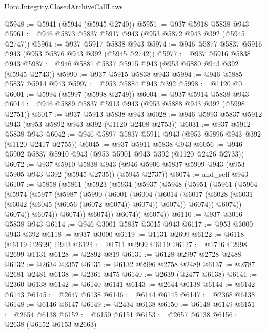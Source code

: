 \begin{lexlean}{Uorc.Integrity.ClosedArchiveCallLaws}
\begin{coremodule}
@5948 := @5941 (@5944 (@5945 @2740))
@5951 := @937 @5918 @5838 @943
@5961 := @946 @5873 @5837 @5917 @943 (@953 @5872 @943 @392 (@5945 @2747))
@5964 := @937 @5917 @5838 @943
@5974 := @946 @5877 @5837 @5916 @943 (@953 @5876 @943 @392 (@5945 @2742))
@5977 := @937 @5916 @5838 @943
@5987 := @946 @5881 @5837 @5915 @943 (@953 @5880 @943 @392 (@5945 @2743))
@5990 := @937 @5915 @5838 @943
@5994 := @946 @5885 @5837 @5914 @943
@5997 := @953 @5884 @943 @392
@5998 := @1120 @0
@6001 := @5994 (@5997 (@5998 @2749))
@6004 := @937 @5914 @5838 @943
@6014 := @946 @5889 @5837 @5913 @943 (@953 @5888 @943 @392 (@5998 @2751))
@6017 := @937 @5913 @5838 @943
@6028 := @946 @5893 @5837 @5912 @943 (@953 @5892 @943 @392 (@1120 @2408 @2753))
@6031 := @937 @5912 @5838 @943
@6042 := @946 @5897 @5837 @5911 @943 (@953 @5896 @943 @392 (@1120 @2417 @2755))
@6045 := @937 @5911 @5838 @943
@6056 := @946 @5902 @5837 @5910 @943 (@953 @5901 @943 @392 (@1120 @2426 @2733))
@6072 := @937
    @5910
    @5838
    @943
    (@946 @5906 @5837 @5909 @943 (@953 @5905 @943 @392 (@5945 @2735)) (@5945 @2737))
@6074 := and_self @943
@6107 := @5858
    (@5861
      (@5923
        (@5934
          (@5937
            (@5948
              (@5951
                (@5961
                  (@5964
                    (@5974
                      (@5977
                        (@5987
                          (@5990
                            (@6001
                              (@6004
                                (@6014
                                  (@6017
                                    (@6028
                                      (@6031 (@6042 (@6045 (@6056 (@6072 @6074)) @6074)) @6074))
                                    @6074))
                                @6074))
                            @6074))
                        @6074))
                    @6074))
                @6074))
            @6074))
        @6074))
@6110 := @937 @3016 @5838 @943
@6114 := @946 @3001 @5837 @3015 @943
@6117 := @953 @3000 @943 @392
@6118 := @937 @3000
@6119 := @1131 @2699
@6122 := @6118 (@6119 @2699) @943
@6124 := @1711 @2999 @6119
@6127 := @1716 @2998 @2699 @1131
@6128 := @2892 @819
@6131 := @6128 @2997 @2728 @2488
@6132 := @2634 @2357
@6135 := @6132 @2996 @2758 @2489
@6137 := @2787 @2681 @2481
@6138 := @2361 @475
@6140 := @2639 (@2477 @6138)
@6141 := @2360 @6138
@6142 := @6140 @6141
@6143 := @2644 @6138
@6144 := @6142 @6143
@6145 := @2647 @6138
@6146 := @6144 @6145
@6147 := @2368 @6138
@6148 := @6146 @6147
@6149 := @2434 @6138
@6150 := @6148 @6149
@6151 := @2654 @6138
@6152 := @6150 @6151
@6153 := @2657 @6138
@6156 := @2638 (@6152 @6153 @2663)

\end{coremodule}
\end{lexlean}

